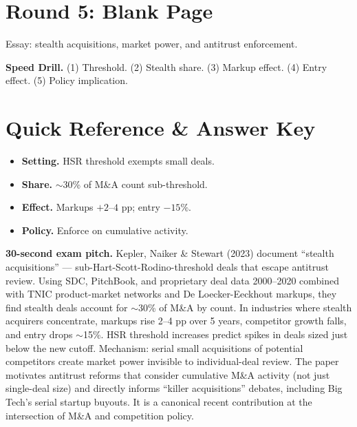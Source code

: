 \documentclass[11pt]{article}
\begin{document}
\section*{Round 5: Blank Page}
Essay: stealth acquisitions, market power, and antitrust enforcement.

\vspace{6pt}
\begin{drillbox}
\textbf{Speed Drill.} (1) Threshold. (2) Stealth share. (3) Markup effect. (4) Entry effect. (5) Policy implication.
\end{drillbox}

\section*{Quick Reference \& Answer Key}
\begin{answerbox}
\begin{itemize}
\item \textbf{Setting.} HSR threshold exempts small deals.
\item \textbf{Share.} $\sim$30\% of M\&A count sub-threshold.
\item \textbf{Effect.} Markups $+2$--$4$ pp; entry $-15\%$.
\item \textbf{Policy.} Enforce on cumulative activity.
\end{itemize}
\end{answerbox}

\begin{keybox}
\textbf{30-second exam pitch.} Kepler, Naiker \& Stewart (2023) document ``stealth acquisitions'' --- sub-Hart-Scott-Rodino-threshold deals that escape antitrust review. Using SDC, PitchBook, and proprietary deal data 2000--2020 combined with TNIC product-market networks and De Loecker-Eeckhout markups, they find stealth deals account for $\sim$30\% of M\&A by count. In industries where stealth acquirers concentrate, markups rise 2--4 pp over 5 years, competitor growth falls, and entry drops $\sim$15\%. HSR threshold increases predict spikes in deals sized just below the new cutoff. Mechanism: serial small acquisitions of potential competitors create market power invisible to individual-deal review. The paper motivates antitrust reforms that consider cumulative M\&A activity (not just single-deal size) and directly informs ``killer acquisitions'' debates, including Big Tech's serial startup buyouts. It is a canonical recent contribution at the intersection of M\&A and competition policy.
\end{keybox}
\end{document}
